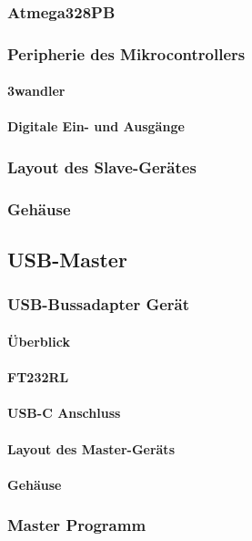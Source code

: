 \subsubsection{Atmega328PB}
\subsubsection{Peripherie des Mikrocontrollers}
\paragraph{3wandler}

\paragraph{Digitale Ein- und Ausgänge}
\subsubsection{Layout des Slave-Gerätes}
\subsubsection{Gehäuse}


\subsection{USB-Master}
\subsubsection{USB-Bussadapter Gerät}
\paragraph{Überblick}
\paragraph{FT232RL}
\paragraph{USB-C Anschluss}
\paragraph{Layout des Master-Geräts}
\paragraph{Gehäuse}

\subsubsection{Master Programm}
